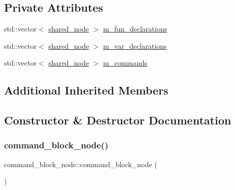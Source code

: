 \subsection*{Private Attributes}
\begin{DoxyCompactItemize}
\item 
std\+::vector$<$ \hyperlink{namespacejawe_a3f307481d921b6cbb50cc8511fc2b544}{shared\+\_\+node} $>$ \hyperlink{classjawe_1_1command__block__node_a1305c1454886bd3c1aa6a7ae293d1301}{m\+\_\+fun\+\_\+declarations}
\item 
std\+::vector$<$ \hyperlink{namespacejawe_a3f307481d921b6cbb50cc8511fc2b544}{shared\+\_\+node} $>$ \hyperlink{classjawe_1_1command__block__node_a20dbb8211a19cbbf46e85f61e31d4695}{m\+\_\+var\+\_\+declarations}
\item 
std\+::vector$<$ \hyperlink{namespacejawe_a3f307481d921b6cbb50cc8511fc2b544}{shared\+\_\+node} $>$ \hyperlink{classjawe_1_1command__block__node_a33e8d6b53bb74acb1364769a9f240dd5}{m\+\_\+commands}
\end{DoxyCompactItemize}
\subsection*{Additional Inherited Members}


\subsection{Constructor \& Destructor Documentation}
\mbox{\label{classjawe_1_1command__block__node_a3114c27da8e02aaecae198adbc2444b7}} 
\subsubsection{\texorpdfstring{command\+\_\+block\+\_\+node()}{command\_block\_node()}\hspace{0.1cm}{\footnotesize\ttfamily [1/3]}}
{\footnotesize\ttfamily command\+\_\+block\+\_\+node\+::command\+\_\+block\+\_\+node (\begin{DoxyParamCaption}{ }\end{DoxyParamCaption})}

\mbox{\label{classjawe_1_1command__block__node_a833c98a4433d6ccffe9eca004cc92fdd}} 
